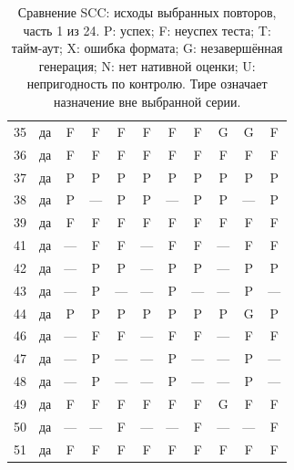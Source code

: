 \begin{table}[p]
\begin{tabular*}{\textwidth}{@{\extracolsep{\fill}}rc*{9}{c}@{}}
35 & да & F & F & F & F & F & F & G & G & F\\
36 & да & F & F & F & F & F & F & F & F & F\\
37 & да & P & P & P & P & P & P & P & P & P\\
38 & да & P & — & P & P & — & P & P & — & P\\
39 & да & F & F & F & F & F & F & F & F & F\\
41 & да & — & F & F & — & F & F & — & F & F\\
42 & да & — & P & P & — & P & P & — & P & P\\
43 & да & — & P & — & — & P & — & — & P & —\\
44 & да & P & P & P & P & P & P & P & G & P\\
46 & да & — & F & F & — & F & F & — & F & F\\
47 & да & — & P & — & — & P & — & — & P & —\\
48 & да & — & P & — & — & P & — & — & P & —\\
49 & да & F & F & F & F & F & F & G & F & F\\
50 & да & — & — & F & — & — & F & — & — & F\\
51 & да & F & F & F & F & F & F & F & F & F\\
\bottomrule\end{tabular*}
\caption{Сравнение SCC: исходы выбранных повторов, часть 1 из 24. P: успех; F: неуспех теста; T: тайм-аут; X: ошибка формата; G: незавершённая генерация; N: нет нативной оценки; U: непригодность по контролю. Тире означает назначение вне выбранной серии.}
\end{table}
\clearpage
